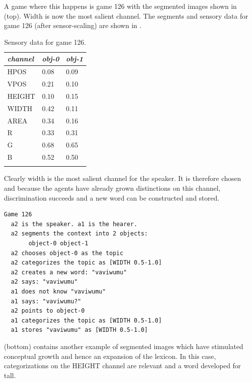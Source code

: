 A game where this happens is game 126 with the segmented images
shown in  (top). Width is now the most salient
channel. The segments and sensory data for game 126 
(after sensor-scaling) are shown in . 
\begin{table}
\begin{center}
\begin{tabular}{ l  l  l }
\lsptoprule
{\itshape channel}& {\itshape obj-0} & {\itshape obj-1}\\ \midrule
HPOS & 0.08 & 0.09\\ 
VPOS & 0.21 & 0.10\\ 
HEIGHT & 0.10 & 0.15\\ 
WIDTH & 0.42 & 0.11\\ 
AREA & 0.34 & 0.16\\ 
R & 0.33 & 0.31\\ 
G & 0.68 & 0.65\\ 
B & 0.52 & 0.50\\ 
\lspbottomrule
\end{tabular}
\caption{ \label{tab:game126} Sensory data for game 126.}
\end{center}
\end{table}
Clearly width is the most salient channel for the speaker. 
It is therefore chosen and because the 
agents have already grown distinctions on this channel, 
discrimination succeeds and a new word can be
constructed and stored. 
\begin{verbatim}
Game 126 
  a2 is the speaker. a1 is the hearer. 
  a2 segments the context into 2 objects: 
       object-0 object-1
  a2 chooses object-0 as the topic 
  a2 categorizes the topic as [WIDTH 0.5-1.0]
  a2 creates a new word: "vaviwumu"
  a2 says: "vaviwumu"
  a1 does not know "vaviwumu"
  a1 says: "vaviwumu?"
  a2 points to object-0
  a1 categorizes the topic as [WIDTH 0.5-1.0]
  a1 stores "vaviwumu" as [WIDTH 0.5-1.0]
\end{verbatim}
 (bottom) contains another example
of segmented images which have stimulated conceptual
growth and hence an expansion of the lexicon. 
In this case, categorizations on the HEIGHT channel are
relevant and a word developed for tall.
